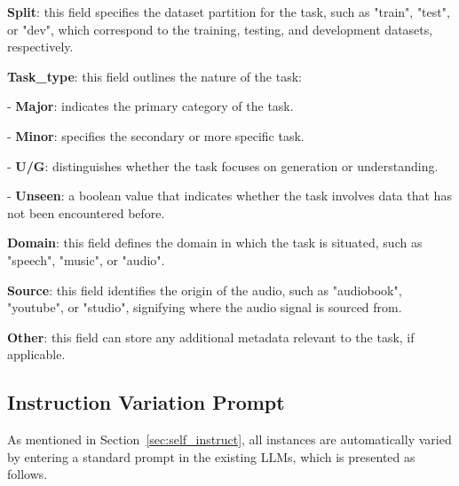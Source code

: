 \textbf{Split}: this field specifies the dataset partition for the task, such as "train", "test", or "dev", which correspond to the training, testing, and development datasets, respectively.

\textbf{Task\_type}: this field outlines the nature of the task:

- \textbf{Major}: indicates the primary category of the task.

- \textbf{Minor}: specifies the secondary or more specific task.

- \textbf{U/G}: distinguishes whether the task focuses on generation or understanding.

- \textbf{Unseen}: a boolean value that indicates whether the task involves data that has not been encountered before.

\textbf{Domain}: this field defines the domain in which the task is situated, such as "speech", "music", or "audio".

\textbf{Source}: this field identifies the origin of the audio, such as "audiobook", "youtube", or "studio", signifying where the audio signal is sourced from.

\textbf{Other}: this field can store any additional metadata relevant to the task, if applicable.

\subsection{Instruction Variation Prompt}
\label{appendix:instruction_variation_prompt}
As mentioned in Section~\ref{sec:self_instruct}, all instances are automatically varied by entering a standard prompt in the existing LLMs, which is presented as follows. 



